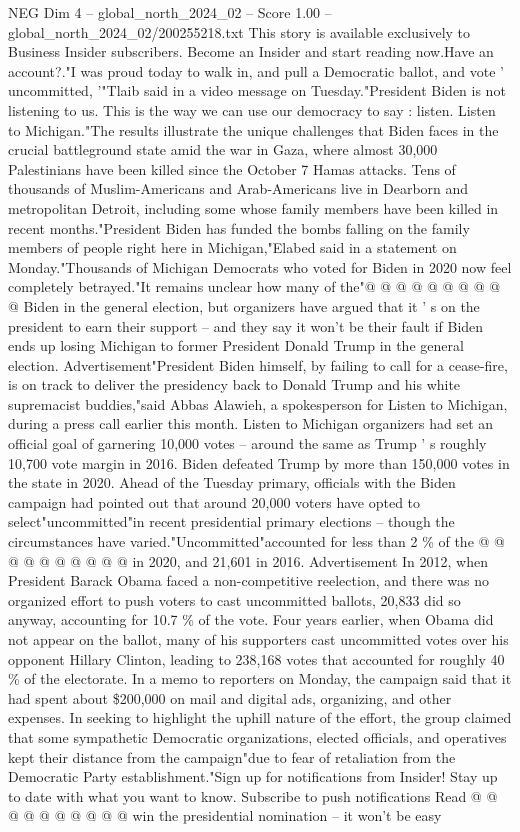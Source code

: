 \begin{textsample}{NEG Dim 4 – global\_north\_2024\_02 – Score 1.00 – global\_north\_2024\_02/200255218.txt}  \label{ex:f4_neg_278}
This story is available exclusively to Business Insider subscribers.
Become an Insider and start reading now.Have an account?."I was proud today to walk in, and pull a Democratic ballot, and vote ' uncommitted, '"Tlaib said in a video message on Tuesday."President Biden is not listening to us.
This is the way we can use our democracy to say : listen.
Listen to Michigan."The results illustrate the unique challenges that Biden faces in the crucial battleground state amid the war in Gaza, where almost 30,000 Palestinians have been killed since the October 7 Hamas attacks.
Tens of thousands of Muslim-Americans and Arab-Americans live in Dearborn and metropolitan Detroit, including some whose family members have been killed in recent months."President Biden has funded the bombs falling on the family members of people right here in Michigan,"Elabed said in a statement on Monday."Thousands of Michigan Democrats who voted for Biden in 2020 now feel completely betrayed."It remains unclear how many of the"@ @ @ @ @ @ @ @ @ @ Biden in the general election, but organizers have argued that it ' s on the president to earn their support -- and they say it won't be their fault if Biden ends up losing Michigan to former President Donald Trump in the general election.
Advertisement"President Biden himself, by failing to call for a cease-fire, is on track to deliver the presidency back to Donald Trump and his white supremacist buddies,"said Abbas Alawieh, a spokesperson for Listen to Michigan, during a press call earlier this month.
Listen to Michigan organizers had set an official goal of garnering 10,000 votes -- around the same as Trump ' s roughly 10,700 vote margin in 2016.
Biden defeated Trump by more than 150,000 votes in the state in 2020.
Ahead of the Tuesday primary, officials with the Biden campaign had pointed out that around 20,000 voters have opted to select"uncommitted"in recent presidential primary elections -- though the circumstances have varied."Uncommitted"accounted for less than 2 \% of the @ @ @ @ @ @ @ @ @ @ in 2020, and 21,601 in 2016.
Advertisement In 2012, when President Barack Obama faced a non-competitive reelection, and there was no organized effort to push voters to cast uncommitted ballots, 20,833 did so anyway, accounting for 10.7 \% of the vote.
Four years earlier, when Obama did not appear on the ballot, many of his supporters cast uncommitted votes over his opponent Hillary Clinton, leading to 238,168 votes that accounted for roughly 40 \% of the electorate.
In a memo to reporters on Monday, the campaign said that it had spent about \$200,000 on mail and digital ads, organizing, and other expenses.
In seeking to highlight the uphill nature of the effort, the group claimed that some sympathetic Democratic organizations, elected officials, and operatives kept their distance from the campaign"due to fear of retaliation from the Democratic Party establishment."Sign up for notifications from Insider!
Stay up to date with what you want to know.
Subscribe to push notifications Read @ @ @ @ @ @ @ @ @ @ win the presidential nomination -- it won't be easy

\end{textsample}
